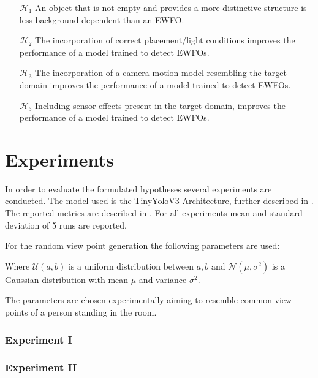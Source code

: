\begin{enumerate}
	\item[$\mathcal{H}_1$] An object that is not empty and provides a more distinctive structure is less background dependent than an \ac{EWFO}.
	
	\item[$\mathcal{H}_2$] The incorporation of correct placement/light conditions improves the performance of a model trained to detect \acp{EWFO}.
	
	\item[$\mathcal{H}_3$] The incorporation of a camera motion model resembling the target domain improves the performance of a model trained to detect \acp{EWFO}. 
	
	\item[$\mathcal{H}_3$] Including sensor effects present in the target domain, improves the performance of a model trained to detect \acp{EWFO}. 
	
\end{enumerate}



\section{Experiments}
\label{sec:training:experiments}
In order to evaluate the formulated hypotheses several experiments are conducted. The model used is the TinyYoloV3-Architecture, further described in . The reported metrics are described in . For all experiments mean and standard deviation of 5 runs are reported.

For the random view point generation the following parameters are used:


Where $ \mathcal{U}(a,b)$ is a uniform distribution between $a,b$ and $\mathcal{N}(\mu,\sigma^2)$ is a Gaussian distribution with mean $\mu$ and variance $\sigma^2$.

The parameters are chosen experimentally aiming to resemble common view points of a person standing in the room.

\subsubsection{Experiment I}


\subsubsection{Experiment II}



